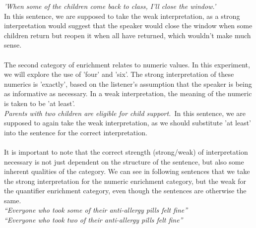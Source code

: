 \documentclass[]{article}
\begin{document}
\textit{'When some of the children come back to class, I'll close the window.'}\\
In this sentence, we are supposed to take the weak interpretation, as a strong interpretation would suggest that the speaker would close the window when some children return but reopen it when all have returned, which wouldn't make much sense. \\
\\
The second category of enrichment relates to numeric values. In this experiment, we will explore the use of 'four' and 'six'. The strong interpretation of these numerics is 'exactly', based on the listener's assumption that the speaker is being as informative as necessary. In a weak interpretation, the meaning of the numeric is taken to be 'at least'.\\
\textit{Parents with two children are eligible for child support.}\
In this sentence, we are supposed to again take the weak interpretation, as we should substitute 'at least' into the sentence for the correct interpretation.\\
\\
It is important to note that the correct strength (strong/weak) of interpretation necessary is not just dependent on the structure of the sentence, but also some inherent qualities of the category. We can see in following sentences that we take the strong interpretation for the numeric enrichment category, but the weak for the quantifier enrichment category, even though the sentences are otherwise the same.\\
\textit{“Everyone who took some of their anti-allergy pills felt fine”} \\
\textit{“Everyone who took two of their anti-allergy pills felt fine”} \\
\\
\end{document}
